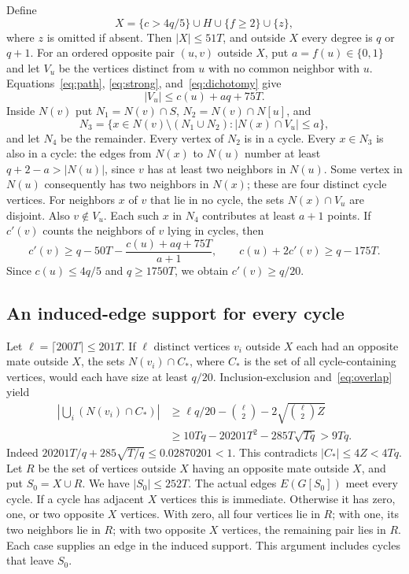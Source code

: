 \documentclass[11pt]{article}
\theoremstyle{remark}\newtheorem*{remark}{Remark}
\begin{document}
Define
\[
 X=\{c>4q/5\}\cup H\cup\{f\geq2\}\cup\{z\},
\]
where $z$ is omitted if absent. Then $|X|\leq51T$, and outside $X$ every degree is $q$ or $q+1$.
For an ordered opposite pair $(u,v)$ outside $X$, put $a=f(u)\in\{0,1\}$ and let $V_u$ be the vertices distinct from $u$ with no common neighbor with $u$. Equations~\eqref{eq:path}, \eqref{eq:strong}, and~\eqref{eq:dichotomy} give
\[
 |V_u|\leq c(u)+aq+75T.
\]
Inside $N(v)$ put $N_1=N(v)\cap S$, $N_2=N(v)\cap N[u]$, and
\[
 N_3=\{x\in N(v)\setminus(N_1\cup N_2):|N(x)\cap V_u|\leq a\},
\]
and let $N_4$ be the remainder. Every vertex of $N_2$ is in a cycle. Every $x\in N_3$ is also in a cycle: the edges from $N(x)$ to $N(u)$ number at least $q+2-a>|N(u)|$, since $v$ has at least two neighbors in $N(u)$. Some vertex in $N(u)$ consequently has two neighbors in $N(x)$; these are four distinct cycle vertices.
For neighbors $x$ of $v$ that lie in no cycle, the sets $N(x)\cap V_u$ are disjoint. Also $v\notin V_u$. Each such $x$ in $N_4$ contributes at least $a+1$ points. If $c'(v)$ counts the neighbors of $v$ lying in cycles, then
\[
 c'(v)\geq q-50T-\frac{c(u)+aq+75T}{a+1},
 \qquad c(u)+2c'(v)\geq q-175T.
\]
Since $c(u)\leq4q/5$ and $q\geq1750T$, we obtain $c'(v)\geq q/20$.

\subsection{An induced-edge support for every cycle}
Let $\ell=\lceil200T\rceil\leq201T$. If $\ell$ distinct vertices $v_i$ outside $X$ each had an opposite mate outside $X$, the sets $N(v_i)\cap C_*$, where $C_*$ is the set of all cycle-containing vertices, would each have size at least $q/20$. Inclusion-exclusion and~\eqref{eq:overlap} yield
\begin{align*}
 |\bigcup_i(N(v_i)\cap C_*)|
 &\geq \ell q/20-\binom\ell2-2\sqrt{\binom\ell2Z}\\
 &\geq10Tq-20201T^2-285T\sqrt{Tq}>9Tq.
\end{align*}
Indeed $20201T/q+285\sqrt{T/q}\leq0.02870201<1$. This contradicts $|C_*|\leq4Z<4Tq$.
Let $R$ be the set of vertices outside $X$ having an opposite mate outside $X$, and put $S_0=X\cup R$. We have $|S_0|\leq252T$.
The actual edges $E(G[S_0])$ meet every cycle. If a cycle has adjacent $X$ vertices this is immediate. Otherwise it has zero, one, or two opposite $X$ vertices. With zero, all four vertices lie in $R$; with one, its two neighbors lie in $R$; with two opposite $X$ vertices, the remaining pair lies in $R$. Each case supplies an edge in the induced support. This argument includes cycles that leave $S_0$.
\end{document}
